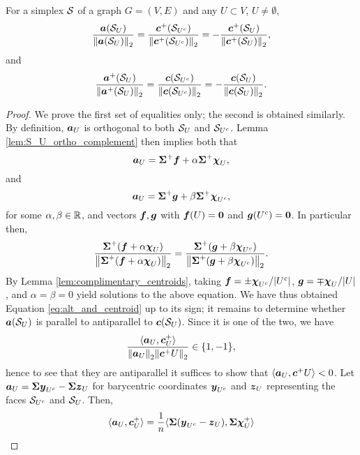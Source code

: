 \begin{lemma}
\label{lem:alt_and_centroid}
For a simplex $\mathcal{S}$ of a graph $G=(V,E)$ and any $U\subset V$, $U\neq\emptyset$, 
\begin{equation}
\label{eq:alt_and_centroid}
    \frac{\vb*{a}(\mathcal{S}_U)}{\norm{\vb*{a}(\mathcal{S}_{U})}_2}=\frac{\vb*{c}^+(\mathcal{S}_{U^c})}{\norm{\vb*{c}^+(\mathcal{S}_{U^c})}_2}=-\frac{\vb*{c}^+(\mathcal{S}_{U})}{\norm{\vb*{c}^+(\mathcal{S}_{U})}_2},
\end{equation}
and 
\begin{equation*}
    \frac{\vb*{a}^+(\mathcal{S}_U)}{\norm{\vb*{a}^+(\mathcal{S}_{U})}_2}=\frac{\vb*{c}(\mathcal{S}_{U^c})}{\norm{\vb*{c}(\mathcal{S}_{U^c})}_2}=-\frac{\vb*{c}(\mathcal{S}_{U})}{\norm{\vb*{c}(\mathcal{S}_{U})}_2}.
\end{equation*}
\end{lemma}
\begin{proof}
We prove the first set of equalities only; the second is obtained similarly. By definition, $\vb*{a}_U$ is orthogonal to both $\mathcal{S}_U$ and $\mathcal{S}_{U^c}$. Lemma \ref{lem:S_U_ortho_complement} then implies both that 
\begin{equation*}
\vb*{a}_U = \boldsymbol{\Sigma}^+\vb*{f} + \alpha \boldsymbol{\Sigma}^+\boldsymbol{\chi}_U,
\end{equation*}
and 
\begin{equation*}
\vb*{a}_U = \boldsymbol{\Sigma}^+\vb*{g} + \beta\boldsymbol{\Sigma}^+\boldsymbol{\chi}_{U^c},
\end{equation*}
for some $\alpha,\beta\in\mathbb{R}$, and vectors $\vb*{f},\vb*{g}$ with $\vb*{f}(U)=\vb{0}$ and $\vb*{g}(U^c)=\vb{0}$. In particular then, 
\begin{equation}
\label{eq:lem_alt_centroid1}
\frac{\boldsymbol{\Sigma}^+(\vb*{f}+\alpha\boldsymbol{\chi}_U)}{\norm{\boldsymbol{\Sigma}^+(\vb*{f}+\alpha\boldsymbol{\chi}_U)}_2}=\frac{\boldsymbol{\Sigma}^+(\vb*{g}+\beta\boldsymbol{\chi}_{U^c})}{\norm{\boldsymbol{\Sigma}^+(\vb*{g}+\beta\boldsymbol{\chi}_{U^c})}_2}.
\end{equation}
By Lemma \ref{lem:complimentary_centroids}, taking $\vb*{f}=\pm\boldsymbol{\chi}_{U^c}/|U^c|$, $\vb*{g}=\mp\boldsymbol{\chi}_U/|U|$, and $\alpha=\beta=0$ yield solutions to the above equation. We have thus obtained Equation \eqref{eq:alt_and_centroid} up to its sign; 
it remains to determine whether $\vb*{a}(\mathcal{S}_U)$ is parallel to antiparallel to $\vb*{c}(\mathcal{S}_U)$. Since it is one of the two, we have 
\[\frac{\langle \vb*{a}_U,\vb*{c}^+_U\rangle}{\norm{\vb*{a}_U}_2\norm{\vb*{c}^+U}_2}\in\{1,-1\},\]
hence to see that they are antiparallel it suffices to show that $\langle \vb*{a}_U,\vb*{c}^+U\rangle<0$. Let $\vb*{a}_U= \boldsymbol{\Sigma}\vb*{y}_{U^c}-\boldsymbol{\Sigma}\vb*{z}_U$ for barycentric coordinates $\vb*{y}_{U^c}$ and $\vb*{z}_U$ representing the faces $\mathcal{S}_{U^c}$ and $\mathcal{S}_U$. Then, 
\begin{align*}
\la \alt_U,\cent^+_U\ra &= \frac{1}{n}\la \Sv(\y_{U^c}-\z_U),\Sv\bchi^+_U\ra \\

\end{align*}
\end{proof}
